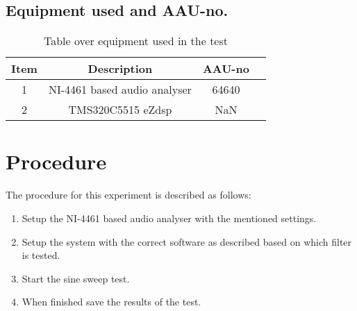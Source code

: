 \subsection*{Equipment used and AAU-no.}

\begin{table}[H]
\centering
{}
\begin{tabular}{S[table-format=1]ccc} \toprule
    {Item} & {Description} & {AAU-no} \\       &  NI-4461 based audio analyser  & 64640  \\ 
    2      &  TMS320C5515 eZdsp  & NaN  \\  \bottomrule 
\end{tabular}
\caption{Table over equipment used in the test}
\label{tab:UsedEquipmentDecimation}
\end{table}
\vspace{-5mm}


\section{Procedure}
The procedure for this experiment is described as follows:
\vspace{-5mm}
\begin{enumerate}\addtolength{\itemsep}{-.35\baselineskip} 
\item Setup the NI-4461 based audio analyser with the mentioned settings.
\item Setup the system with the correct software as described based on which filter is tested.
\item Start the sine sweep test.
\item When finished save the results of the test.
\end{enumerate}

